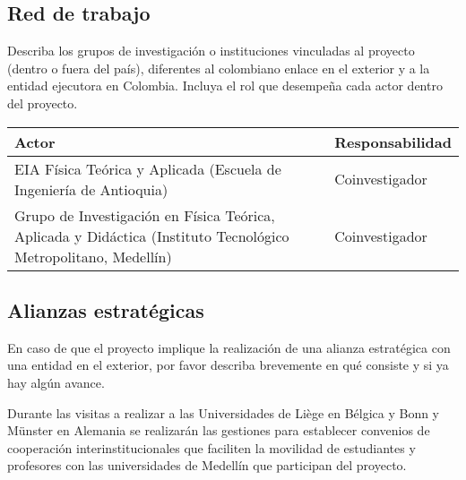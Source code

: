 \subsection{Red de trabajo}
\begin{instrucciones}
  Describa los grupos de investigación o instituciones vinculadas al
  proyecto (dentro o fuera del país), diferentes al colombiano enlace
  en el exterior y a la entidad ejecutora en Colombia. Incluya el rol
  que desempeña cada actor dentro del proyecto.
\end{instrucciones}

\begin{tabular}{|p{6cm}|l|}\hline
Actor & Responsabilidad\\\hline  
EIA Física Teórica y Aplicada 
(Escuela de Ingeniería de Antioquia)& Coinvestigador\\\hline
Grupo de Investigación en Física Teórica, Aplicada y Didáctica
(Instituto Tecnológico Metropolitano, Medellín)&Coinvestigador \\\hline
\end{tabular}

\subsection{Alianzas estratégicas}
\begin{instrucciones}
  En caso de que el proyecto implique la realización de una alianza
  estratégica con una entidad en el exterior, por favor describa
  brevemente en qué consiste y si ya hay algún avance.
\end{instrucciones}
Durante las visitas a realizar a las Universidades de Liège en Bélgica
y Bonn y M\"unster en Alemania se realizarán las gestiones para
establecer convenios de cooperación interinstitucionales que faciliten
la movilidad de estudiantes y profesores con las universidades de
Medellín que participan del proyecto.
